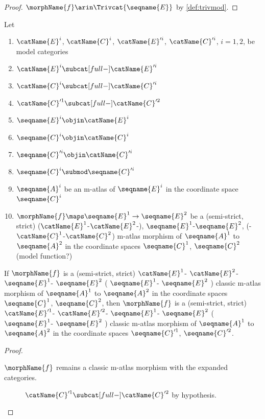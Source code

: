 \documentclass{article}
\begin{document}
\begin{lemma}
\begin{enumerate}
\begin{proof}
$\morphName{f} \arin \Trivcat{\seqname{E}}$ by \cref{def:trivmod}.
\end{proof}
\end{enumerate}

Let
\begin{enumerate}
\item
$\catName{E}^i$, $\catName{C}^i$,
$\catName{E}'^i$, $\catName{C}'^i$, $i=1,2$, be model categories
\item
$\catName{E}^i \subcat[full-] \catName{E}'^i$
\item
$\catName{C}^i \subcat[full-] \catName{C}'^i$
\item
$\catName{C}'^1 \subcat[full-] \catName{C}'^2$
\item
$\seqname{E}^i \objin \catName{E}^i$
\item
$\seqname{C}^i \objin \catName{C}^i$
\item
$\seqname{C}'^i \objin \catName{C}'^i$
\item
$\seqname{C}^i \submod \seqname{C}'^i$
\item
$\seqname{A}^i$ be an m-atlas of $\seqname{E}^i$ in the coordinate space
$\seqname{C}^i$
\item
$\morphName{f} \maps \seqname{E}^1 \to \seqname{E}^2$ be a
(semi-strict, strict)
\nobreaks
  {
    {($\catName{E}^1$-$\catName{E}^2$-)},
    {$\seqname{E}^1$-$\seqname{E}^2$},
    {(-$\catName{C}^1$-$\catName{C}^2$)}
  }
m-atlas morphism of $\seqname{A}^1$ to $\seqname{A}^2$ in the
coordinate spaces $\seqname{C}^1$, $\seqname{C}^2$
(model function?)
\end{enumerate}

If $\morphName{f}$ is a (semi-strict, strict)
$\catName{E}^1$-%
$\catName{E}^2$-%
$\seqname{E}^1$-%
$\seqname{E}^2$
(%
$\seqname{E}^1$-%
$\seqname{E}^2$%
)
classic m-atlas morphism of
$\seqname{A}^1$ to $\seqname{A}^2$ in the coordinate spaces
$\seqname{C}^1$, $\seqname{C}^2$, then $\morphName{f}$ is a
(semi-strict, strict)
$\catName{E}'^1$-%
$\catName{E}'^2$-%
$\seqname{E}^1$-%
$\seqname{E}^2$
(
$\seqname{E}^1$-%
$\seqname{E}^2$%
)
classic m-atlas morphism of $\seqname{A}^1$ to $\seqname{A}^2$ in the
coordinate spaces $\seqname{C}'^1$, $\seqname{C}'^2$.

\begin{proof}
\leavevmode
\begin{description}
\item[$\morphName{f}$ remains a classic m-atlas morphism with the expanded categories.]
$\catName{C}'^1 \subcat[full-] \catName{C}'^2$ by hypothesis.


\end{description}
\end{proof}
\end{lemma}
\end{document}
